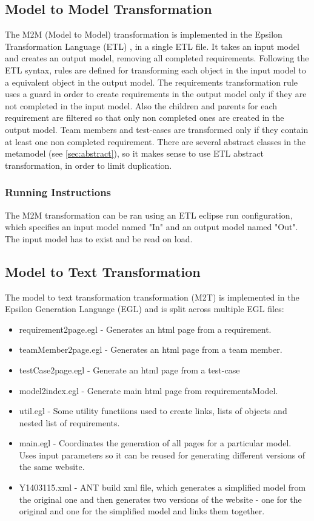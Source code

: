 \documentclass[11pt,a4paper]{article}
\begin{document}
	\subsection{Model to Model Transformation}
	The M2M (Model to Model) transformation is implemented in the Epsilon Transformation Language (ETL) \cite{etl}, in a single ETL file. It takes an input model and creates an output model, removing all completed requirements. Following the ETL syntax, rules are defined for transforming each object in the input model to a equivalent object in the output model. The requirements transformation rule uses a guard in order to create requirements in the output model only if they are not completed in the input model. Also the children and parents for each requirement are filtered so that only non completed ones are created in the output model. Team members and test-cases are transformed only if they contain at least one non completed requirement. There are several abstract classes in the metamodel (see \autoref{sec:abstract}), so it makes sense to use ETL abstract transformation, in order to limit duplication.
	
	\subsubsection{Running Instructions}
	The M2M transformation can be ran using an ETL eclipse run configuration, which specifies an input model named "In" and an output model named "Out". The input model has to exist and be read on load.
	
	\subsection{Model to Text Transformation}
	The model to text transformation transformation (M2T) is implemented in the Epsilon Generation Language (EGL) \cite{egl} and is split across multiple EGL files:
	
	\begin{itemize}[noitemsep]	
		\item requirement2page.egl - Generates an html page from a requirement.
		\item teamMember2page.egl  - Generates an html page from a team member.
		\item testCase2page.egl - Generate an html page from a test-case
		\item model2index.egl - Generate main html page from requirementsModel.
		\item util.egl - Some utility functiions used to create links, lists of objects and nested list of requirements.
		\item main.egl - Coordinates the generation of all pages for a particular model. Uses input parameters so it can be reused for generating different versions of the same website.
		\item Y1403115.xml - ANT \cite{ant} build xml file, which generates a simplified model from the original one and then generates two versions of the website - one for the original and one for the simplified model and links them together.
	\end{itemize}
\end{document}
